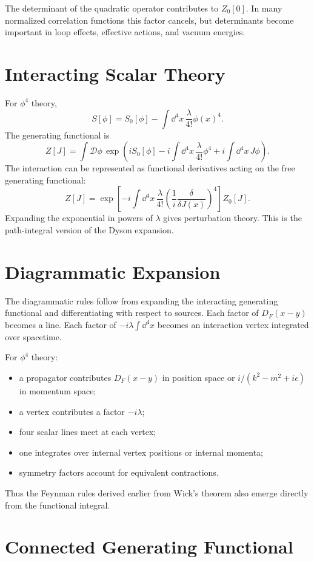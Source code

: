 The determinant of the quadratic operator contributes to \(Z_0[0]\). In many
normalized correlation functions this factor cancels, but determinants become
important in loop effects, effective actions, and vacuum energies.

\section{Interacting Scalar Theory}

For \(\phi^4\) theory,
\[
    S[\phi]
    = S_0[\phi]-\int\dd^4x\,\frac{\lambda}{4!}\phi(x)^4.
\]
The generating functional is
\[
    Z[J]
    = \int\mathcal{D}\phi\,
      \exp\left(iS_0[\phi]-i\int\dd^4x\,\frac{\lambda}{4!}\phi^4
      +i\int\dd^4x\,J\phi\right).
\]
The interaction can be represented as functional derivatives acting on the free
generating functional:
\[
    Z[J]
    = \exp\left[-i\int\dd^4x\,\frac{\lambda}{4!}
      \left(\frac{1}{i}\frac{\delta}{\delta J(x)}\right)^4\right]Z_0[J].
\]
Expanding the exponential in powers of \(\lambda\) gives perturbation theory.
This is the path-integral version of the Dyson expansion.

\section{Diagrammatic Expansion}

The diagrammatic rules follow from expanding the interacting generating
functional and differentiating with respect to sources. Each factor of
\(D_F(x-y)\) becomes a line. Each factor of \(-i\lambda\int\dd^4x\) becomes an
interaction vertex integrated over spacetime.

For \(\phi^4\) theory:
\begin{itemize}
    \item a propagator contributes \(D_F(x-y)\) in position space or
    \(i/(k^2-m^2+i\epsilon)\) in momentum space;
    \item a vertex contributes a factor \(-i\lambda\);
    \item four scalar lines meet at each vertex;
    \item one integrates over internal vertex positions or internal momenta;
    \item symmetry factors account for equivalent contractions.
\end{itemize}
Thus the Feynman rules derived earlier from Wick's theorem also emerge directly
from the functional integral.

\section{Connected Generating Functional}

